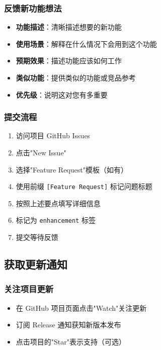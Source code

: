 \documentclass[10pt,a4paper]{article}
\begin{document}
\begin{itemize}
\begin{itemize}
\begin{itemize}
\begin{itemize}
\begin{enumerate}
\subsubsection{反馈新功能想法}
\begin{itemize}
  \item \textbf{功能描述}：清晰描述想要的新功能
  \item \textbf{使用场景}：解释在什么情况下会用到这个功能
  \item \textbf{预期效果}：描述功能应该如何工作
  \item \textbf{类似功能}：提供类似的功能或竞品参考
  \item \textbf{优先级}：说明这对您有多重要
\end{itemize}

\subsubsection{提交流程}
\begin{enumerate}
  \item 访问项目 GitHub Issues
  \item 点击"New Issue"
  \item 选择"Feature Request"模板（如有）
  \item 使用前缀 \texttt{[Feature Request]} 标记问题标题
  \item 按照上述要点填写详细信息
  \item 标记为 \texttt{enhancement} 标签
  \item 提交等待反馈
\end{enumerate}

\subsection{获取更新通知}

\subsubsection{关注项目更新}
\begin{itemize}
  \item 在 GitHub 项目页面点击"Watch"关注更新
  \item 订阅 Release 通知获知新版本发布
  \item 点击项目的"Star"表示支持（可选）
\end{itemize}


\end{enumerate}
\end{itemize}
\end{itemize}
\end{itemize}
\end{itemize}
\end{document}
